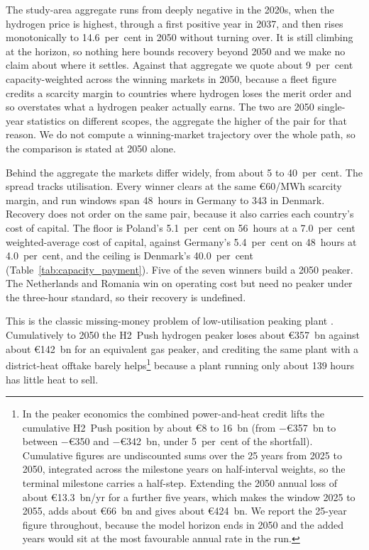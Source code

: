 The study-area aggregate runs from deeply negative in the 2020s, when the hydrogen price
is highest, through a first positive year in 2037, and then rises monotonically to
14.6~per~cent in 2050 without turning over. It is still climbing at the horizon, so
nothing here bounds recovery beyond 2050 and we make no claim about where it settles.
Against that aggregate we quote about 9~per~cent capacity-weighted across the winning
markets in 2050, because a fleet figure credits a scarcity margin to countries where
hydrogen loses the merit order and so overstates what a hydrogen peaker actually earns.
The two are 2050 single-year statistics on different scopes, the aggregate the higher of
the pair for that reason. We do not compute a winning-market trajectory over the whole
path, so the comparison is stated at 2050 alone.

Behind the aggregate the markets differ widely, from about 5 to 40~per~cent. The spread
tracks utilisation. Every winner clears at the same \euro{}60/MWh scarcity margin, and run
windows span 48~hours in Germany to 343 in Denmark. Recovery does not order on the same
pair, because it also carries each country's cost of capital. The floor is Poland's
5.1~per~cent on 56~hours at a 7.0~per~cent weighted-average cost of capital, against
Germany's 5.4~per~cent on 48~hours at 4.0~per~cent, and the ceiling is Denmark's
40.0~per~cent (Table~\ref{tab:capacity_payment}). Five of the seven winners build a 2050 peaker. The Netherlands and Romania win on
operating cost but need no peaker under the three-hour standard, so their recovery is
undefined.

This is the classic missing-money problem of low-utilisation peaking plant
\citep{Joskow2008capacity}. Cumulatively to 2050 the H2~Push hydrogen peaker loses
about \euro{}357~bn against about \euro{}142~bn for an equivalent gas peaker,
and crediting the same plant with a district-heat
offtake barely helps\footnote{In the peaker economics the combined power-and-heat
credit lifts the cumulative H2~Push position by about \euro{}8 to 16~bn (from
$-$\euro{}357~bn to between $-$\euro{}350 and $-$\euro{}342~bn, under 5~per~cent of the
shortfall). Cumulative figures are undiscounted sums over the 25 years from 2025 to
2050, integrated across the milestone years on half-interval weights, so the terminal
milestone carries a half-step. Extending the 2050 annual loss of about
\euro{}13.3~bn/yr for a further five years, which makes the window 2025 to 2055, adds
about \euro{}66~bn and gives about \euro{}424~bn. We report the 25-year figure throughout, because
the model horizon ends in 2050 and the added years would sit at the most favourable
annual rate in the run.} because a plant running only about
139 hours has little heat to sell.

